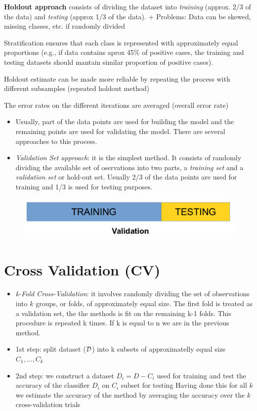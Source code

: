 \documentclass[]{book}
\providecommand{\tightlist}{%
  \setlength{\itemsep}{0pt}\setlength{\parskip}{0pt}}
\begin{document}
\textbf{Holdout approach} consists of dividing the dataset into
\emph{training} (approx. 2/3 of the data) and \emph{testing} (approx 1/3
of the data). + Problems: Data can be skewed, missing classes, etc. if
randomly divided

Stratification ensures that each class is represented with approximately
equal proportions (e.g., if data contains aprox 45\% of positive cases,
the training and testing datasets should mantain similar proportion of
positive cases).

Holdout estimate can be made more reliable by repeating the process with
different subsamples (repeated holdout method)

The error rates on the different iterations are averaged (overall error
rate)

\begin{itemize}
\tightlist
\item
  Usually, part of the data points are used for building the model and
  the remaining points are used for validating the model. There are
  several approaches to this process.
\item
  \emph{Validation Set approach}: it is the simplest method. It consists
  of randomly dividing the available set of oservations into two parts,
  a \emph{training set} and a \emph{validation set} or hold-out set.
  Usually 2/3 of the data points are used for training and 1/3 is used
  for testing purposes.
\end{itemize}

\begin{figure}[htbp]
\centering
\includegraphics{figures/validation.png}
\caption{}
\end{figure}

\section{Cross Validation (CV)}\label{cross-validation-cv}

\begin{itemize}
\item
  \emph{k-Fold Cross-Validation}: it involves randomly dividing the set
  of observations into \(k\) groups, or folds, of approximately equal
  size. The first fold is treated as a validation set, the the methods
  is fit on the remaining k-1 folds. This procedure is repeated k times.
  If k is equal to n we are in the previous method.
\item
  1st step: split dataset (\(\cal D\)) into k subsets of approximatelly
  equal size \(C_1, \dots, C_k\)
\item
  2nd step: we construct a dataset \(D_i = D-C_i\) used for training and
  test the accuracy of the classifier \(D_i\) on \(C_i\) subset for
  testing Having done this for all \(k\) we estimate the accuracy of the
  method by averaging the accuracy over the \(k\) cross-validation
  trials
\end{itemize}
\end{document}

